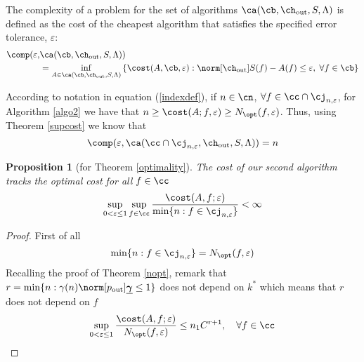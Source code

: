 \documentclass[final]{elsarticle}
\newcommand{\chout}{\ch_{\text{\rm{out}}}}
\newcommand{\pout}{p_{\text{\rm{out}}}}
\newcommand{\bgamma}{\underline{\boldsymbol\gamma}}
\newtheorem{prop}[theorem]{Proposition}
\theoremstyle{definition}
\theoremstyle{remark}
\begin{document}
The complexity of a problem for the set of algorithms $\ca(\cb,\chout,S,\Lambda)$ is defined as the cost of the cheapest algorithm that satisfies the specified error tolerance, $\varepsilon$:
\begin{equation}\label{complexity2}
\begin{aligned}
\comp(\varepsilon,&\ca(\cb,\chout,S,\Lambda))\\
&=\inf_{A\in\ca(\cb,\chout,S,\Lambda)}\left\{\cost(A,\cb,\varepsilon):\norm[\chout]{S(f)-A(f)}\le\varepsilon,\; \forall f\in\cb\right\}
\end{aligned}
\end{equation}

According to notation in equation (\ref{indexdef}), if $n\in\cn$, $\forall f\in\cc\cap\cj_{n,\varepsilon}$, for Algorithm \ref{algo2} we have that $n\ge\cost(A;f,\varepsilon)\ge N_{\opt}(f,\varepsilon)$. Thus, using Theorem \ref{supcost} we know that
\begin{equation*}
\comp(\varepsilon,\ca(\cc\cap\cj_{n,\varepsilon},\chout,S,\Lambda))=n
\end{equation*}

\begin{prop}[for Theorem \ref{optimality}]\label{optimcost}
The cost of our second algorithm tracks the optimal cost for all $f\in\cc$
\begin{equation*}
\sup_{0 < \varepsilon \le 1}\sup_{f\in\cc} \frac{\cost(A,f;\varepsilon)} {\min\{n:f\in\cj_{n,\varepsilon}\}} <\infty
\end{equation*}
\end{prop}
\begin{proof}
First of all
\begin{equation*}
\min\{n:f\in\cj_{n,\varepsilon}\}=N_{\opt}(f,\varepsilon)
\end{equation*}
Recalling the proof of Theorem \ref{nopt}, remark that $r=\min\{n: \gamma(n)\norm[\pout]{\bgamma} \le 1\}$ does not depend on $k^*$ which means that $r$ does not depend on $f$
\begin{equation*}
\sup_{0 < \varepsilon \le 1} \frac{\cost(A,f;\varepsilon)} {N_{\opt}(f,\varepsilon)} \le n_1C^{r+1},\quad\forall f\in\cc
\end{equation*}
\end{proof}
\end{document}
